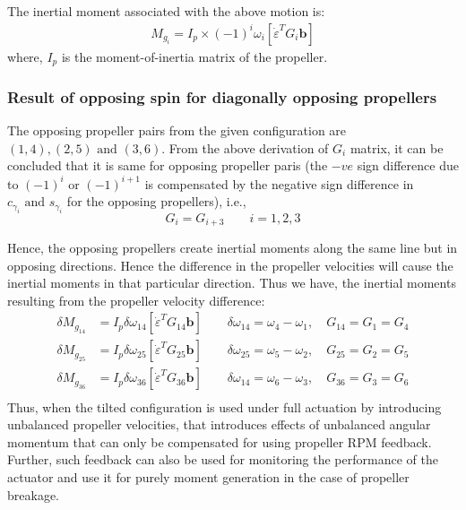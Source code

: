 %
The inertial moment associated with the above motion is:
\begin{align*}
    M_{g_i} =  I_p \times (-1)^{i} \omega_i \left[\dot \varepsilon^T  G_i \pmb b \right]
\end{align*}
where, $I_p$ is the moment-of-inertia matrix of the propeller.
%
\subsubsection{Result of opposing spin for diagonally opposing propellers}
%
The opposing propeller pairs from the given configuration are $(1, 4), (2, 5) \text{ and } (3, 6)$. From the above derivation of $G_i$ matrix, it can be concluded that it is same for opposing propeller paris (the $-ve$ sign difference due to $(-1)^i$ or $(-1)^{i+1}$ is compensated by the negative sign difference in $c_{\gamma_i} \text{ and } s_{\gamma_i}$ for the opposing propellers), i.e.,
$$ G_{i} = G_{i+3} \qquad i = 1, 2, 3$$

Hence, the opposing propellers create inertial moments along the same line but in opposing directions. Hence the difference in the propeller velocities will cause the inertial moments in that particular direction. Thus we have, the inertial moments resulting from the propeller velocity difference:
%
\begin{align*}
    \delta M_{g_{14}} &=   I_p \delta \omega_{14} \left[\dot \varepsilon^T  G_{1 4} \pmb b \right] \qquad \delta \omega_{14} = \omega_4 - \omega_1, \quad G_{14} = G_1 = G_4\\
    \delta M_{g_{25}} &=   I_p \delta \omega_{25} \left[\dot \varepsilon^T  G_{2 5} \pmb b \right] \qquad \delta \omega_{25} = \omega_5 - \omega_2, \quad G_{25} = G_2 = G_5\\
    \delta M_{g_{36}} &=   I_p \delta \omega_{36} \left[\dot \varepsilon^T  G_{3 6} \pmb b \right] \qquad \delta \omega_{14} = \omega_6 - \omega_3, \quad G_{36} = G_3 = G_6\\
\end{align*}
%
Thus, when the tilted configuration is used under full actuation by introducing unbalanced propeller velocities, that introduces effects of unbalanced angular momentum that can only be compensated for using propeller RPM feedback. Further, such feedback can also be used for monitoring the performance of the actuator and use it for purely moment generation in the case of propeller breakage.
